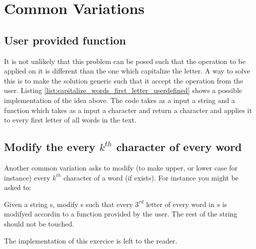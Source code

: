 \section{Common Variations}
\label{capitalize_words_first_letter:sec:variation}

\subsection{User provided function}
It is not unlikely that this problem can be posed such that the operation to be applied on it is different than the one which capitalize the letter. A way to solve this is to make the solution generic such that it accept the operation from the user.  Listing \ref{list:capitalize_words_first_letter_userdefined} shows a possible implementation of the idea above. The code takes as a input a string and a function which takes as a input a character and return a character and applies it to every first letter of all words in the text.




\subsection{Modify the every $k^{th}$ character of every word}
Another common variation asks to modify (to make upper, or lower case for instance) every $k^{th}$ character of a word (if exists). For instance you might be asked to:

\begin{exercise}
Given a string s, modify s such that every $3^{rd}$ letter of every word in $s$ is modifyed accordin to a function provided by the user. The rest of the string should not be touched.
\end{exercise}
The implementation of this exercice is left to the reader.

